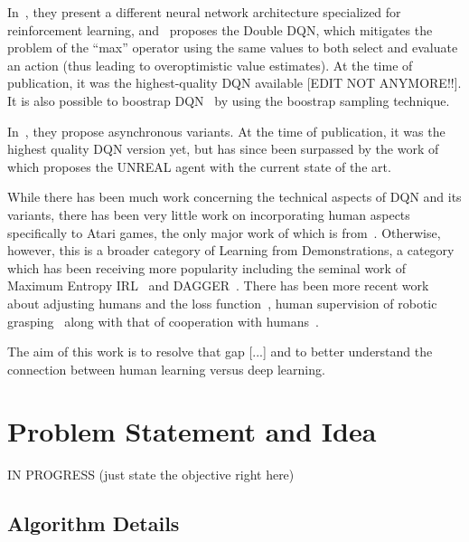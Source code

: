 \documentclass[letterpaper, 10pt, conference]{ieeeconf}
\begin{document}
In~\cite{DBLP:conf/icml/WangSHHLF16}, they present a different neural network
architecture specialized for reinforcement learning,
and~\cite{DBLP:conf/aaai/HasseltGS16} proposes the Double DQN, which mitigates
the problem of the ``max'' operator using the same values to both select and
evaluate an action (thus leading to overoptimistic value estimates). At the time
of publication, it was the highest-quality DQN available [EDIT NOT ANYMORE!!].
It is also possible to boostrap DQN~\cite{NIPS2016_6501} by using the boostrap
sampling technique.

In~\cite{DBLP:conf/icml/MnihBMGLHSK16}, they propose asynchronous variants. At
the time of publication, it was the highest quality DQN version yet, but has
since been surpassed by the work of~\cite{DBLP:journals/corr/JaderbergMCSLSK16}
which proposes the UNREAL agent with the current state of the art.

While there has been much work concerning the technical aspects of DQN and its
variants, there has been very little work on incorporating human aspects
specifically to Atari games, the only major work of which is
from~\cite{DBLP:journals/corr/HosuR16}. Otherwise, however, this is a broader
category of Learning from Demonstrations, a category which has been receiving
more popularity including the seminal work of Maximum Entropy
IRL~\cite{Ziebart_2008_6055} and DAGGER~\cite{DBLP:journals/jmlr/RossGB11}.
There has been more recent work about adjusting humans and the loss
function~\cite{conf/nips/KimFPP13}, human supervision of robotic
grasping~\cite{DBLP:journals/corr/LaskeyCLMKJDG16,DBLP:dblp_conf/icra/LaskeySHMPDG16}
along with that of cooperation with humans~\cite{NIPS2016_6420}.

The aim of this work is to resolve that gap [...] and to better understand the
connection between human learning versus deep learning.



\section{Problem Statement and Idea}\label{sec:idea}

IN PROGRESS (just state the objective right here)

\subsection{Algorithm Details}\label{ssec:algorithm}
\end{document}
